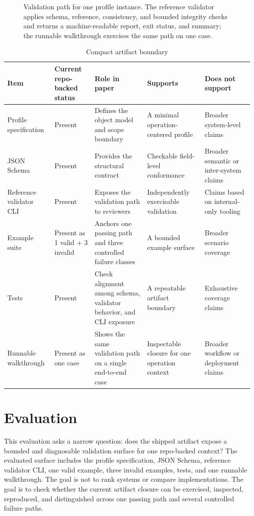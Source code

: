 \documentclass[conference]{IEEEtran}
\begin{document}
\begin{figure}[t]
\centering
{}
\caption{Validation path for one profile instance. The reference validator applies schema, reference, consistency, and bounded integrity checks and returns a machine-readable report, exit status, and summary; the runnable walkthrough exercises the same path on one case.}
\label{fig:validator}
\end{figure}

\begin{table}[t]
\caption{Compact artifact boundary}
\label{tab:boundary}
\centering
\footnotesize
\begin{tabular}{p{}p{}p{}p{}p{}}
\toprule
Item & Current repo-backed status & Role in paper & Supports & Does not support \\
\midrule
Profile specification & Present & Defines the object model and scope boundary & A minimal operation-centered profile & Broader system-level claims \\
JSON Schema & Present & Provides the structural contract & Checkable field-level conformance & Broader semantic or inter-system claims \\
Reference validator CLI & Present & Exposes the validation path to reviewers & Independently exercisable validation & Claims based on internal-only tooling \\
Example suite & Present as 1 valid + 3 invalid & Anchors one passing path and three controlled failure classes & A bounded example surface & Broader scenario coverage \\
Tests & Present & Check alignment among schema, validator behavior, and CLI exposure & A repeatable artifact boundary & Exhaustive coverage claims \\
Runnable walkthrough & Present as one case & Shows the same validation path on a single end-to-end case & Inspectable closure for one operation context & Broader workflow or deployment claims \\
\bottomrule
\end{tabular}
\end{table}

\section{Evaluation}

This evaluation asks a narrow question: does the shipped artifact expose a bounded and diagnosable validation surface for one repo-backed context? The evaluated surface includes the profile specification, JSON Schema, reference validator CLI, one valid example, three invalid examples, tests, and one runnable walkthrough. The goal is not to rank systems or compare implementations. The goal is to check whether the current artifact closure can be exercised, inspected, reproduced, and distinguished across one passing path and several controlled failure paths.
\end{document}
